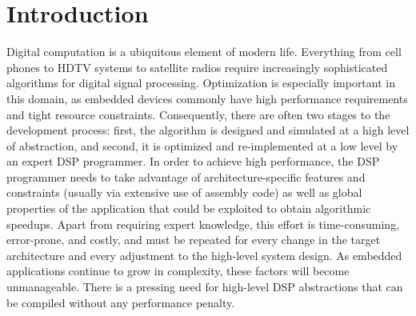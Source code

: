  

\section{Introduction}
Digital computation is a ubiquitous element of modern life.
Everything from cell phones to HDTV systems to satellite radios
require increasingly sophisticated algorithms for digital signal
processing.  Optimization is especially important in this domain, as
embedded devices commonly have high performance requirements and tight
resource constraints.  Consequently, there are often two stages to the
development process: first, the algorithm is designed and simulated at
a high level of abstraction, and second, it is optimized and
re-implemented at a low level by an expert DSP programmer.  In order
to achieve high performance, the DSP programmer needs to take
advantage of architecture-specific features and constraints (usually
via extensive use of assembly code) as well as global properties of
the application that could be exploited to obtain algorithmic
speedups.  Apart from requiring expert knowledge, this effort is
time-consuming, error-prone, and costly, and must be repeated for
every change in the target architecture and every adjustment to the
high-level system design.  As embedded applications continue to grow
in complexity, these factors will become unmanageable.  There is a
pressing need for high-level DSP abstractions that can be compiled
without any performance penalty.

